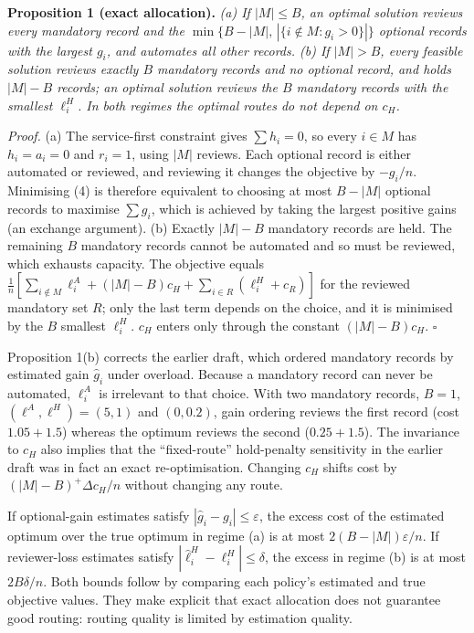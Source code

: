 \documentclass[
  11pt,
]{article}
\begin{document}
\textbf{Proposition 1 (exact allocation).} \emph{(a) If \(|M|\le B\), an
optimal solution reviews every mandatory record and the
\(\min\{B-|M|,\,|\{i\notin M: g_i>0\}|\}\) optional records with the
largest \(g_i\), and automates all other records. (b) If \(|M|>B\),
every feasible solution reviews exactly \(B\) mandatory records and no
optional record, and holds \(|M|-B\) records; an optimal solution
reviews the \(B\) mandatory records with the smallest \(\ell^H_i\). In
both regimes the optimal routes do not depend on \(c_H\).}

\emph{Proof.} (a) The service-first constraint gives \(\sum h_i = 0\),
so every \(i\in M\) has \(h_i=a_i=0\) and \(r_i=1\), using \(|M|\)
reviews. Each optional record is either automated or reviewed, and
reviewing it changes the objective by \(-g_i/n\). Minimising (4) is
therefore equivalent to choosing at most \(B-|M|\) optional records to
maximise \(\sum g_i\), which is achieved by taking the largest positive
gains (an exchange argument). (b) Exactly \(|M|-B\) mandatory records
are held. The remaining \(B\) mandatory records cannot be automated and
so must be reviewed, which exhausts capacity. The objective equals
\(\frac1n[\sum_{i\notin M}\ell^A_i + (|M|-B)c_H + \sum_{i\in R}(\ell^H_i+c_R)]\)
for the reviewed mandatory set \(R\); only the last term depends on the
choice, and it is minimised by the \(B\) smallest \(\ell^H_i\). \(c_H\)
enters only through the constant \((|M|-B)c_H\). \(\square\)

Proposition 1(b) corrects the earlier draft, which ordered mandatory
records by estimated gain \(\hat g_i\) under overload. Because a
mandatory record can never be automated, \(\ell^A_i\) is irrelevant to
that choice. With two mandatory records, \(B=1\),
\((\ell^A,\ell^H)=(5,1)\) and \((0,0.2)\), gain ordering reviews the
first record (cost \(1.05+1.5\)) whereas the optimum reviews the second
(\(0.25+1.5\)). The invariance to \(c_H\) also implies that the
``fixed-route'' hold-penalty sensitivity in the earlier draft was in
fact an exact re-optimisation. Changing \(c_H\) shifts cost by
\((|M|-B)^+\Delta c_H/n\) without changing any route.

If optional-gain estimates satisfy \(|\hat g_i-g_i|\le\varepsilon\), the
excess cost of the estimated optimum over the true optimum in regime (a)
is at most \(2(B-|M|)\varepsilon/n\). If reviewer-loss estimates satisfy
\(|\hat\ell^H_i-\ell^H_i|\le\delta\), the excess in regime (b) is at
most \(2B\delta/n\). Both bounds follow by comparing each policy's
estimated and true objective values. They make explicit that exact
allocation does not guarantee good routing: routing quality is limited
by estimation quality.
\end{document}

